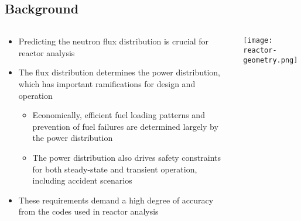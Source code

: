 \subsection{Background}
\begin{frame}

\begin{columns}
    \begin{column}{0.6\textwidth}
        \begin{itemize}
            \item Predicting the neutron flux distribution is crucial for reactor analysis
            \item The flux distribution determines the power distribution, which has important ramifications for design and operation
            \begin{itemize}
                \item Economically, efficient fuel loading patterns and prevention of fuel failures are determined largely by the power distribution
                \item The power distribution also drives safety constraints for both steady-state and transient operation, including accident scenarios
            \end{itemize}
            \item These requirements demand a high degree of accuracy from the codes used in reactor analysis
        \end{itemize}
    \end{column}
\begin{column}{0.4\textwidth}
\vfill
\texttt{[image: reactor-geometry.png]}
\vfil
\end{column}
\end{columns}
    
\end{frame}


